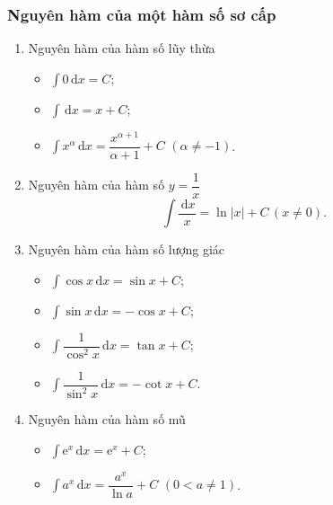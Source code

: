 \subsubsection{Nguyên hàm của một hàm số sơ cấp}
\begin{enumerate}[1.]
	\item Nguyên hàm của hàm số lũy thừa
	\begin{itemize}
		\item $\displaystyle\int{0\mathrm{\,d}x}=C$;
		\item $\displaystyle\int{\mathrm{\,d}x}=x+C$;
		\item $\displaystyle\int{x^\alpha\mathrm{\,d}x}=\dfrac{x^{\alpha+1}}{\alpha+1}+C$ $(\alpha\ne-1)$.
	\end{itemize}
\item Nguyên hàm của hàm số $y=\dfrac{1}{x}$
$$\displaystyle\int{\dfrac{\mathrm{\,d}x}{x}}=\ln |x|+C\,(x\ne0).$$
\item Nguyên hàm của hàm số lượng giác
\begin{itemize}
	\item $\displaystyle\int{\cos x\mathrm{\,d}x}=\sin x+C$;
	\item $\displaystyle\int{\sin x\mathrm{\,d}x}=-\cos x+C$;
	\item $\displaystyle\int{\dfrac{1}{\cos^2x}\mathrm{\,d}x}=\tan x+C$;
	\item $\displaystyle\int{\dfrac{1}{\sin^2x}\mathrm{\,d}x}=-\cot x+C$.
\end{itemize}
\item Nguyên hàm của hàm số mũ
\begin{itemize}
	\item $\displaystyle\int{\mathrm{e}^x\mathrm{\,d}x}=\mathrm{e}^x+C$;
	\item $\displaystyle\int{a^x\mathrm{\,d}x}=\dfrac{a^x}{\ln a}+C$ $(0<a\ne1)$.
\end{itemize}
\end{enumerate}
